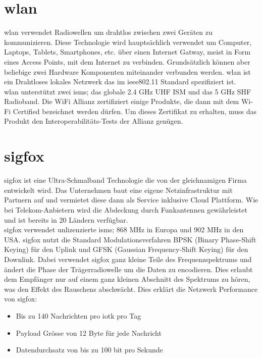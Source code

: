\section{\gls{wlan}}

\gls{wlan} verwendet Radiowellen um drahtlos zwischen zwei Geräten zu kommunizieren. Diese Technologie wird hauptsächlich verwendet um Computer, Laptops, Tablets, Smartphones, etc. über einen Internet Gatway, meist in Form eines Access Points, mit dem Internet zu verbinden. Grundsätzlich können aber beliebige zwei Hardware Komponenten miteinander verbunden werden. \gls{wlan} ist ein Drahtloses lokales Netzwerk das im \gls{ieee802.11} Standard spezifiziert ist.\\
\gls{wlan} unterstützt zwei \glspl{ism}; das globale 2.4 GHz UHF ISM und das 5 GHz SHF Radioband. Die WiFi Allianz zertifiziert einige Produkte, die dann mit dem \glqq{}Wi-Fi Certified\grqq{} bezeichnet werden dürfen. Um dieses Zertifikat zu erhalten, muss das Produkt den Interoperabilitäts-Tests der Allianz genügen.

\section{\gls{sigfox}}

\gls{sigfox} ist eine Ultra-Schmalband Technologie die von der gleichnamigen Firma entwickelt wird. Das Unternehmen baut eine eigene Netzinfrastruktur mit Partnern auf und vermietet diese dann als Service inklusive Cloud Plattform. Wie bei Telekom-Anbietern wird die Abdeckung durch Funkantennen gewährleistet und ist bereits in 20 Ländern verfügbar.\\
\gls{sigfox} verwendet unlizenzierte \glspl{ism}; 868 MHz in Europa und 902 MHz in den USA.
\gls{sigfox} nutzt die Standard Modulationsverfahren BPSK (Binary Phase-Shift Keying) für den Uplink und GFSK (Gaussian Frequency-Shift Keying) für den Downlink. Dabei verwendet \gls{sigfox} ganz kleine Teile des Frequenzspektrums und ändert die Phase der Trägerradiowelle um die Daten zu encodieren. Dies erlaubt dem Empfänger nur auf einem ganz kleinen Abschnitt des Spektrums zu hören, was den Effekt des Rauschens abschwächt.
Dies erklärt die Netzwerk Performance von \gls{sigfox}:

\begin{itemize}
  \item Bis zu 140 Nachrichten pro \gls{iotk} pro Tag
  \item Payload Grösse von 12 Byte für jede Nachricht
  \item Datendurchsatz von bis zu 100 bit pro Sekunde
\end{itemize}

